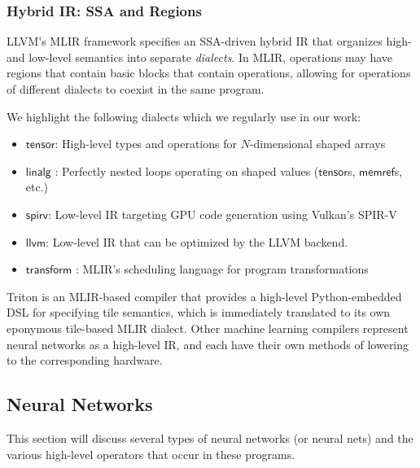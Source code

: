 \documentclass[review, acmsmall, nonacm]{acmart}
\newcommand{\dialect}[1]{$\mathsf{#1}$}
\begin{document}
\subsubsection{Hybrid IR: SSA and Regions} LLVM's MLIR \cite{lattnerMLIRCompilerInfrastructure2020} framework specifies an SSA-driven hybrid IR that organizes high- and low-level semantics into separate \emph{dialects}. In MLIR, operations may have regions that contain basic blocks that contain operations, allowing for operations of different dialects to coexist in the same program.


We highlight the following dialects which we regularly use in our work:
\begin{itemize} 
  \item \dialect{tensor}: High-level types and operations for $N$-dimensional shaped arrays
  \item \dialect{linalg} \cite{thellvmfoundationLinalgDialectMLIR2025}: Perfectly nested loops operating on shaped values (\dialect{tensor}s, \dialect{memref}s, etc.)
  \item \dialect{spirv}: Low-level IR targeting GPU code generation using Vulkan's SPIR-V \cite{khronosSPIRVSpecification2025}
  \item \dialect{llvm}: Low-level IR that can be optimized by the LLVM \cite{lattnerLLVMCompilationFramework2004} backend.
  \item \dialect{transform} \cite{luckeMLIRTransformDialect2024}: MLIR's scheduling language for program transformations 
\end{itemize}

Triton \cite{tilletTritonIntermediateLanguage2019} is an MLIR-based compiler that provides a high-level Python-embedded DSL for specifying tile semantics, which is immediately translated to its own eponymous tile-based MLIR dialect. Other machine learning compilers \cite{anselPyTorch2Faster2024, sabneXLACompilingMachine2020, theireeauthorsIREE2019} represent neural networks as a high-level IR, and each have their own methods of lowering to the corresponding hardware. 

\subsection{Neural Networks}

This section will discuss several types of neural networks (or neural nets) and the various high-level operators that occur in these programs.
\end{document}
